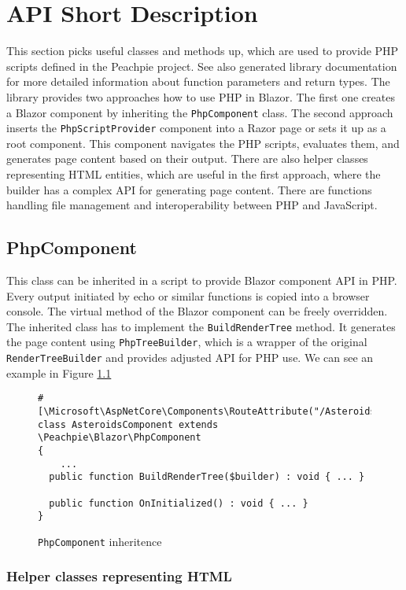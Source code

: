 \chapter{API Short Description}

This section picks useful classes and methods up, which are used to provide PHP scripts defined in the Peachpie project.
See also generated library documentation for more detailed information about function parameters and return types.
The library provides two approaches how to use PHP in Blazor. 
The first one creates a Blazor component by inheriting the \texttt{PhpComponent} class. 
The second approach inserts the \texttt{PhpScriptProvider} component into a Razor page or sets it up as a root component. 
This component navigates the PHP scripts, evaluates them, and generates page content based on their output. 
There are also helper classes representing HTML entities, which are useful in the first approach, where the builder has a complex API for generating page content. There are functions handling file management and interoperability between PHP and JavaScript.

\section{PhpComponent}

This class can be inherited in a script to provide Blazor component API in PHP. Every output initiated by echo or similar functions is copied into a browser console. The virtual method of the Blazor component can be freely overridden. The inherited class has to implement the \texttt{BuildRenderTree} method. It generates the page content using \texttt{PhpTreeBuilder}, which is a wrapper of the original \texttt{RenderTreeBuilder} and provides adjusted API for PHP use.
We can see an example in Figure \ref{img35:inheritance}
\par
\begin{figure}
\begin{lstlisting}
#[\Microsoft\AspNetCore\Components\RouteAttribute("/Asteroids")]
class AsteroidsComponent extends \Peachpie\Blazor\PhpComponent
{  
	...
  public function BuildRenderTree($builder) : void { ... }

  public function OnInitialized() : void { ... }
}
\end{lstlisting}
\caption{\texttt{PhpComponent} inheritence}
\label{img35:inheritance}
\end{figure}

\subsection{Helper classes representing HTML}


